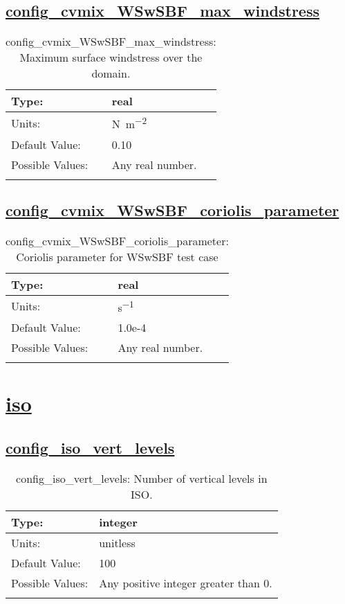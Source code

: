 \subsection[config\_cvmix\_WSwSBF\_max\_windstress]{\hyperref[sec:nm_tab_cvmix_WSwSBF]{config\_cvmix\_WSwSBF\_max\_windstress}}
\label{subsec:nm_sec_config_cvmix_WSwSBF_max_windstress}
\begin{center}
\begin{longtable}{| p{2.0in} || p{4.0in} |}
    \hline
    Type: & real \\
    \hline
    Units: & \si{N.m^{-2}} \\
    \hline
    Default Value: & 0.10 \\
    \hline
    Possible Values: & Any real number. \\
    \hline
    \caption{config\_cvmix\_WSwSBF\_max\_windstress: Maximum surface windstress over the domain.}
\end{longtable}
\end{center}
\subsection[config\_cvmix\_WSwSBF\_coriolis\_parameter]{\hyperref[sec:nm_tab_cvmix_WSwSBF]{config\_cvmix\_WSwSBF\_coriolis\_parameter}}
\label{subsec:nm_sec_config_cvmix_WSwSBF_coriolis_parameter}
\begin{center}
\begin{longtable}{| p{2.0in} || p{4.0in} |}
    \hline
    Type: & real \\
    \hline
    Units: & \si{s^{-1}} \\
    \hline
    Default Value: & 1.0e-4 \\
    \hline
    Possible Values: & Any real number. \\
    \hline
    \caption{config\_cvmix\_WSwSBF\_coriolis\_parameter: Coriolis parameter for WSwSBF test case}
\end{longtable}
\end{center}
\section[iso]{\hyperref[sec:nm_tab_iso]{iso}}
\label{sec:nm_sec_iso}
\subsection[config\_iso\_vert\_levels]{\hyperref[sec:nm_tab_iso]{config\_iso\_vert\_levels}}
\label{subsec:nm_sec_config_iso_vert_levels}
\begin{center}
\begin{longtable}{| p{2.0in} || p{4.0in} |}
    \hline
    Type: & integer \\
    \hline
    Units: & \si{unitless} \\
    \hline
    Default Value: & 100 \\
    \hline
    Possible Values: & Any positive integer greater than 0. \\
    \hline
    \caption{config\_iso\_vert\_levels: Number of vertical levels in ISO.}
\end{longtable}
\end{center}
